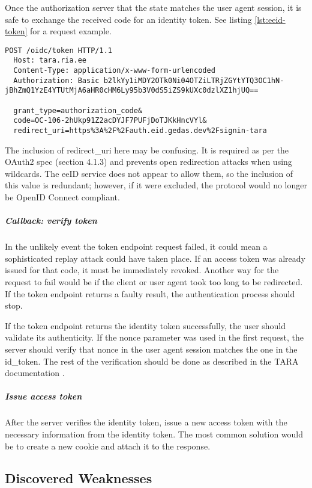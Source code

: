 Once the authorization server that the state matches the user agent session, it is safe to exchange the received code for an identity token. See listing \ref{lst:eeid-token} for a request example.

\begin{lstlisting}[caption={The eeID service token request}, label={lst:eeid-token}]
  POST /oidc/token HTTP/1.1
  Host: tara.ria.ee
  Content-Type: application/x-www-form-urlencoded
  Authorization: Basic b2lkYy1iMDY2OTk0Ni04OTZiLTRjZGYtYTQ3OC1hN-jBhZmQ1YzE4YTUtMjA6aHR0cHM6Ly95b3V0dS5iZS9kUXc0dzlXZ1hjUQ==

  grant_type=authorization_code&
  code=OC-106-2hUkp91Z2acDYJF7PUFjDoTJKkHncVYl&
  redirect_uri=https%3A%2F%2Fauth.eid.gedas.dev%2Fsignin-tara
\end{lstlisting}

The inclusion of redirect\_uri here may be confusing. It is required as per the OAuth2 spec (section 4.1.3) \cite{rfc6749} and prevents open redirection attacks when using wildcards. The eeID service does not appear to allow them, so the inclusion of this value is redundant; however, if it were excluded, the protocol would no longer be OpenID Connect compliant.

\subparagraph{Callback: verify token}

In the unlikely event the token endpoint request failed, it could mean a sophisticated replay attack could have taken place. If an access token was already issued for that code, it must be immediately revoked. Another way for the request to fail would be if the client or user agent took too long to be redirected. If the token endpoint returns a faulty result, the authentication process should stop.

If the token endpoint returns the identity token successfully, the user should validate its authenticity. If the nonce parameter was used in the first request, the server should verify that nonce in the user agent session matches the one in the id\_token. The rest of the verification should be done as described in the TARA documentation \cite{tara-technical}.

\subparagraph{Issue access token}

After the server verifies the identity token, issue a new access token with the necessary information from the identity token. The most common solution would be to create a new cookie and attach it to the response.

\subsection{Discovered Weaknesses}

